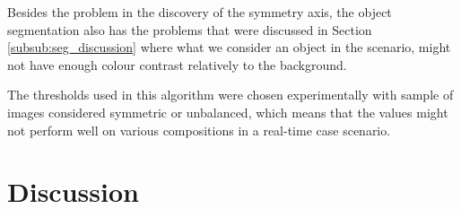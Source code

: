 Besides the problem in the discovery of the symmetry axis, the object segmentation also has the problems that were discussed in Section \ref{subsub:seg_discussion} where what we consider an object in the scenario, might not have enough colour contrast relatively to the background.

The thresholds used in this algorithm were chosen experimentally with sample of images considered symmetric or unbalanced, which means that the values might not perform well on various compositions in a real-time case scenario.

\section{Discussion}
\label{sec:system_discussion}